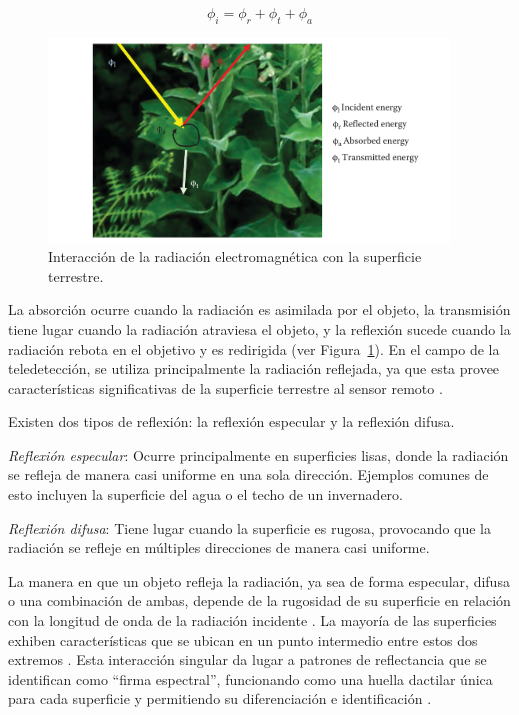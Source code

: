 \begin{equation}
    \phi_{i} = \phi_{r} + \phi_{t} + \phi_{a}
\end{equation}

\begin{figure}[H]
    \begin{center}
        \includegraphics[width=0.95\textwidth]{Images/InteraccionSuperficie.png}
    \end{center}
    \caption{Interacción de la radiación electromagnética con la superficie terrestre.}
    \label{fig:InteraccionSuperficie}
\end{figure}

La absorción ocurre cuando la radiación es asimilada por el objeto, la transmisión tiene lugar cuando la radiación atraviesa el objeto, y la reflexión sucede cuando la radiación rebota en el objetivo y es redirigida (ver Figura~\ref{fig:InteraccionSuperficie}). En el campo de la teledetección, se utiliza principalmente la radiación reflejada, ya que esta provee características significativas de la superficie terrestre al sensor remoto \cite{canada2007fundamentals, tempfli2009principles, chuvieco2016fundamentals}.

Existen dos tipos de reflexión: la reflexión especular y la reflexión difusa.

\textit{Reflexión especular}: Ocurre principalmente en superficies lisas, donde la radiación se refleja de manera casi uniforme en una sola dirección. Ejemplos comunes de esto incluyen la superficie del agua o el techo de un invernadero.

\textit{Reflexión difusa}: Tiene lugar cuando la superficie es rugosa, provocando que la radiación se refleje en múltiples direcciones de manera casi uniforme.

La manera en que un objeto refleja la radiación, ya sea de forma especular, difusa o una combinación de ambas, depende de la rugosidad de su superficie en relación con la longitud de onda de la radiación incidente \cite{tempfli2009principles}. La mayoría de las superficies exhiben características que se ubican en un punto intermedio entre estos dos extremos \cite{canada2007fundamentals}. Esta interacción singular da lugar a patrones de reflectancia que se identifican como ``firma espectral'', funcionando como una huella dactilar única para cada superficie y permitiendo su diferenciación e identificación \cite{chuvieco2016fundamentals}.

